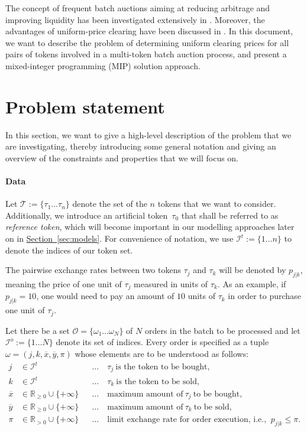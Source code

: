 \documentclass[11pt,parskip=full]{scrartcl}%
\newcommand*{\ie}{i.e., }
\newcommand*{\tokens}{\mathcal{T}}          %
\newcommand*{\orders}{\mathcal{O}}          %
\newcommand*{\itokens}{\mathcal{I}^t}       %
\newcommand*{\iorders}{\mathcal{I}^o}       %
\newcommand*{\secref}[1]{\hyperref[{#1}]{Section~\ref*{#1}}}
\begin{document}
The concept of frequent batch auctions aiming at reducing arbitrage and improving liquidity has
been investigated extensively in \cite{BUDISH-ET-AL_2015:HFT}.
Moreover, the advantages of uniform-price clearing have been discussed in 
\cite{ENGELBRECHT-KAHN_1998:multi-unit-auctions}.
In this document, we want to describe the problem of determining uniform clearing prices for all
pairs of tokens involved in a multi-token batch auction process, and present a mixed-integer
programming (MIP) solution approach.


\clearpage
\section{Problem statement}
\label{sec:problem}

In this section, we want to give a high-level description of the problem that we are investigating,
thereby introducing some general notation and giving an overview of the constraints and properties
that we will focus on.

\vspace{-.3cm}
\paragraph{Data}

Let $ \tokens := \{ \tau_1 \ldots \tau_n \} $ denote the set of the $ n $ tokens that we want to
consider.
Additionally, we introduce an artificial token~$ \tau_0 $ that shall be referred to as 
\emph{reference token}, which will become important in our modelling approaches later on in 
\secref{sec:models}.
For convenience of notation, we use $ \mathcal{I}^t := \{ 1 \ldots n \} $ to denote the indices
of our token set.

The pairwise exchange rates between two tokens $ \tau_j $ and $ \tau_k $ will be denoted by
$ p_{j|k} $, meaning the price of one unit of $ \tau_j $ measured in units of $ \tau_k $.
As an example, if $ p_{j|k} = 10 $, one would need to pay an amount of $ 10 $ units of $ \tau_k $
in order to purchase one unit of $ \tau_j $.

Let there be a set $ \orders = \{ \omega_1 \ldots \omega_N \} $ of $ N $ orders in the batch to be
processed and let $ \iorders := \{ 1 \ldots N \} $ denote its set of indices.
Every order is specified as a tuple $ \omega = (j,k,\overline{x},\overline{y},\pi) $ whose elements
are to be understood as follows:
\begin{align*}
  j &\in \itokens &&
    \ldots \quad \tau_j \> \text{is the token to be bought,}\\
  k &\in \itokens &&
    \ldots \quad \tau_k \> \text{is the token to be sold,}\\
  \overline{x} &\in \mathbb{R}_{\ge 0} \cup \{+\infty\} &&
    \ldots \quad \text{maximum amount of} \> \tau_j \> \text{to be bought,}\\
  \overline{y} &\in \mathbb{R}_{\ge 0} \cup \{+\infty\} &&
    \ldots \quad \text{maximum amount of} \> \tau_k \> \text{to be sold,}\\
  \pi &\in \mathbb{R}_{>0} \cup \{+\infty\} &&
    \ldots \quad \text{limit exchange rate for order execution, \ie} \> p_{j|k} \le \pi.
\end{align*}
\end{document}
